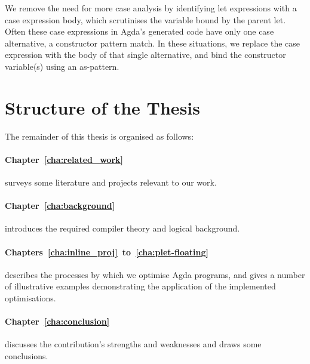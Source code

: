 We remove the need for more case analysis by identifying let expressions with a case expression body, which scrutinises the variable bound by the parent let. Often these case expressions in Agda's generated code have only one case alternative, a constructor pattern match. In these situations, we replace the case expression with the body of that single alternative, and bind the constructor variable(s) using an as-pattern.



\section{Structure of the Thesis}
\label{sec:structure_of_the_thesis}

The remainder of this thesis is organised as follows:

\paragraph{Chapter~\ref{cha:related_work}} surveys some literature and projects relevant to our work.

\paragraph{Chapter~\ref{cha:background}} introduces the required compiler theory and logical background.

\paragraph{Chapters~\ref{cha:inline_proj}~to~\ref{cha:plet-floating}} describes the processes by which we optimise Agda programs, and gives a number of illustrative examples demonstrating the application of the implemented optimisations.

\paragraph{Chapter~\ref{cha:conclusion}} discusses the contribution's strengths and weaknesses and draws some conclusions.
